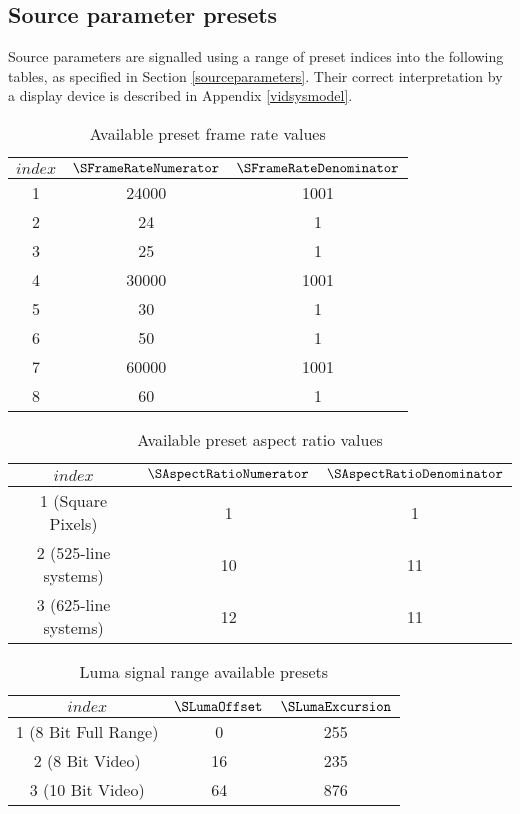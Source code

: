 \subsection{Source parameter presets}
\label{sourceparamspresets}

Source parameters are signalled using a range of preset indices into the following
tables, as specified in Section \ref{sourceparameters}. Their correct
interpretation by a display device is described in Appendix \ref{vidsysmodel}.

\begin{table}[!ht]
\centering
\begin{tabular}{|c|c|c|}
\hline
$index$ & $\SFrameRateNumerator$ & $\SFrameRateDenominator$ \\
\hline
1 & 24000 & 1001 \\
\hline
2 & 24 & 1 \\
\hline
3 & 25 & 1 \\
\hline
4 & 30000 & 1001 \\
\hline
5 & 30 & 1 \\
\hline
6 & 50 & 1 \\
\hline
7 & 60000 & 1001 \\
\hline
8 & 60 & 1 \\
\hline
\end{tabular}
\caption{Available preset frame rate values}\label{table:frameratevalues}
\end{table}

\begin{table}[!ht]
\centering
\begin{tabular}{|c|c|c|}
\hline
$index$ & $\SAspectRatioNumerator$ & $\SAspectRatioDenominator$ \\
\hline
1 (Square Pixels) & 1 & 1 \\
\hline
2 (525-line systems) & 10 & 11 \\
\hline
3 (625-line systems) & 12 & 11 \\
\hline
\end{tabular}
\caption{Available preset aspect ratio values}\label{table:aspectratiovalues}
\end{table}

\begin{table}[!ht]
\centering
\begin{tabular}{|c|c|c|}
\hline
$index$ & $\SLumaOffset$ & $\SLumaExcursion$ \\
\hline
1 (8 Bit Full Range) & 0 & 255 \\
\hline
2 (8 Bit Video) & 16 & 235 \\
\hline
3 (10 Bit Video) & 64 & 876 \\
\hline
\end{tabular}
\caption{Luma signal range available presets}\label{table:lumasignalrangevalues}
\end{table}

